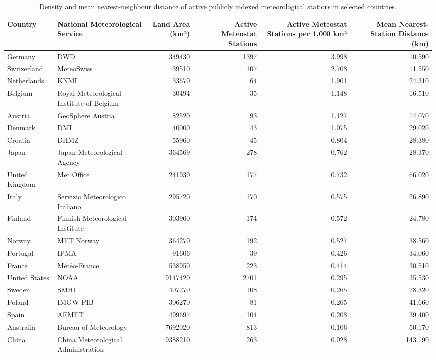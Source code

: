 \begin{table}
\caption{Density and mean nearest-neighbour distance of active publicly indexed meteorological stations in selected countries.}
\label{tab:meteorological_station_density}
\begin{tabular}{llrrrr}
\toprule
Country & National Meteorological Service & Land Area (km²) & Active Meteostat Stations & Active Meteostat Stations per 1,000 km² & Mean Nearest-Station Distance (km) \\
\midrule
Germany & DWD & 349430 & 1397 & 3.998 & 10.590 \\
Switzerland & MeteoSwiss & 39510 & 107 & 2.708 & 11.550 \\
Netherlands & KNMI & 33670 & 64 & 1.901 & 24.310 \\
Belgium & Royal Meteorological Institute of Belgium & 30494 & 35 & 1.148 & 16.510 \\
Austria & GeoSphere Austria & 82520 & 93 & 1.127 & 14.070 \\
Denmark & DMI & 40000 & 43 & 1.075 & 29.020 \\
Croatia & DHMZ & 55960 & 45 & 0.804 & 28.380 \\
Japan & Japan Meteorological Agency & 364569 & 278 & 0.762 & 28.370 \\
United Kingdom & Met Office & 241930 & 177 & 0.732 & 66.020 \\
Italy & Servizio Meteorologico Italiano & 295720 & 170 & 0.575 & 26.890 \\
Finland & Finnish Meteorological Institute & 303960 & 174 & 0.572 & 24.780 \\
Norway & MET Norway & 364270 & 192 & 0.527 & 38.560 \\
Portugal & IPMA & 91606 & 39 & 0.426 & 34.060 \\
France & Météo-France & 538950 & 223 & 0.414 & 30.510 \\
United States & NOAA & 9147420 & 2701 & 0.295 & 35.530 \\
Sweden & SMHI & 407270 & 108 & 0.265 & 28.320 \\
Poland & IMGW-PIB & 306270 & 81 & 0.265 & 41.660 \\
Spain & AEMET & 499697 & 104 & 0.208 & 39.400 \\
Australia & Bureau of Meteorology & 7692020 & 813 & 0.106 & 50.170 \\
China & China Meteorological Administration & 9388210 & 263 & 0.028 & 143.190 \\
\bottomrule
\end{tabular}
\end{table}
